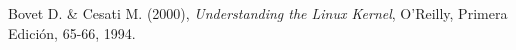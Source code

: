 \begin{thebibliography}{9}

  Bovet D. \& Cesati M. (2000),
  \emph{Understanding the Linux Kernel},
  O'Reilly,
  Primera Edición, 65-66,
  1994.

\end{thebibliography}